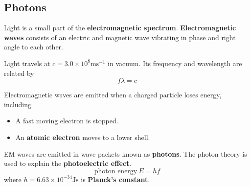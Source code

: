 \subsection{Photons}

Light is a small part of the \textbf{electromagnetic spectrum}. \textbf{Electromagnetic waves} consists of an electric and magnetic wave vibrating in phase and right angle to each other.

Light travels at $c=3.0\times10^8\text{ms}^{-1}$ in vacuum. Its frequency and wavelength are related by
$$f\lambda=c$$

Electromagnetic waves are emitted when a charged particle loses energy, including
\begin{itemize}
    \item A fast moving electron is stopped.
    \item An \textbf{atomic electron} moves to a lower shell.
\end{itemize}

EM waves are emitted in wave packets known as \textbf{photons}. The photon theory is used to explain the \textbf{photoelectric effect}.
$$\text{photon energy}\ E=hf$$
where $h=6.63\times10^{-34}\text{Js}$ is \textbf{Planck's constant}.
